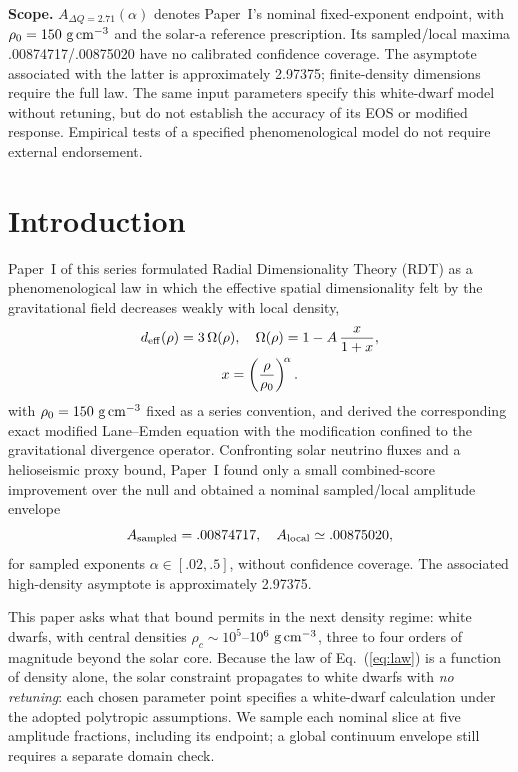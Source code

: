 \documentclass[twocolumn,prd,superscriptaddress,nofootinbib]{revtex4-2}
\begin{document}
\noindent\textbf{Scope.}
$A_{\Delta Q=2.71}(\alpha)$ denotes Paper~I's nominal fixed-exponent endpoint,
with $\rho_0=150~{\rm g\,cm^{-3}}$ and the solar-a reference prescription.
Its sampled/local maxima .00874717/.00875020 have no calibrated confidence
coverage. The asymptote associated with the latter is approximately 2.97375;
finite-density dimensions require the full law. The same input parameters
specify this white-dwarf model without retuning, but do not establish the
accuracy of its EOS or modified response. Empirical tests of a specified
phenomenological model do not require external endorsement.

\section{Introduction}

Paper~I of this series \cite{PaperI} formulated Radial Dimensionality
Theory (RDT) as a phenomenological law in which the effective spatial
dimensionality felt by the gravitational field decreases weakly with local
density,
\begin{equation}
\begin{gathered}
d_{\rm eff}(\rho)=3\,\Omega(\rho),\quad
\Omega(\rho)=1-A\,\frac{x}{1+x},\\
x=\left(\frac{\rho}{\rho_0}\right)^{\!\alpha}.
\end{gathered}
\label{eq:law}
\end{equation}
with $\rho_0 = 150~{\rm g\,cm^{-3}}$ fixed as a series convention, and
derived the corresponding exact modified Lane--Emden equation with the
modification confined to the gravitational divergence operator. Confronting
solar neutrino fluxes and a helioseismic proxy bound, Paper~I found only a small combined-score improvement over the null and
obtained a nominal sampled/local amplitude envelope
\begin{equation}
A_{\rm sampled}=.00874717,\quad A_{\rm local}\simeq.00875020,
\label{eq:solarbound}
\end{equation}
for sampled exponents $\alpha\in[.02,.5]$, without confidence coverage. The associated high-density asymptote is approximately 2.97375.

This paper asks what that bound permits in the next density regime:
white dwarfs, with central densities $\rho_c \sim 10^5$--$10^6~{\rm
g\,cm^{-3}}$, three to four orders of magnitude beyond the solar core.
Because the law of Eq.~(\ref{eq:law}) is a function of density alone, the
solar constraint propagates to white dwarfs with \emph{no retuning}: each
chosen parameter point specifies a white-dwarf calculation under the
adopted polytropic assumptions. We sample each nominal slice at five amplitude fractions, including its endpoint; a global continuum envelope still requires a separate domain check.
\end{document}

